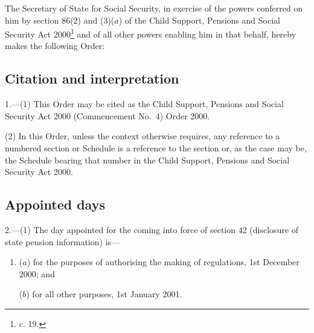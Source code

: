\documentclass[12pt,a4paper]{article}
\title{\regstitle}
\author{S.I. 2000 No. 3166 (C.101)}
\date{Made 30th November 2000}
\begin{document}
\maketitle

\noindent
The Secretary of State for Social Security, in exercise of the powers conferred on him by section 86(2) and (3)($a$)  of the Child Support, Pensions and Social Security Act 2000\footnote{ c. 19.} and of all other powers enabling him in that behalf, hereby makes the following Order: 

{\sloppy

\tableofcontents

}

\bigskip

\setcounter{secnumdepth}{-2}

\subsection[1. Citation and interpretation]{Citation and interpretation}

1.---(1)  This Order may be cited as the Child Support, Pensions and Social Security Act 2000 (Commencement No.\ 4) Order 2000.

(2) In this Order, unless the context otherwise requires, any reference to a numbered section or Schedule is a reference to the section or, as the case may be, the Schedule bearing that number in the Child Support, Pensions and Social Security Act 2000.

\subsection[2. Appointed days]{Appointed days}

2.---(1)  The day appointed for the coming into force of section 42 (disclosure of state pension information) is—
\begin{enumerate}\item[]
($a$) for the purposes of authorising the making of regulations, 1st December 2000; and

($b$) for all other purposes, 1st January 2001.
\end{enumerate}
\end{document}
